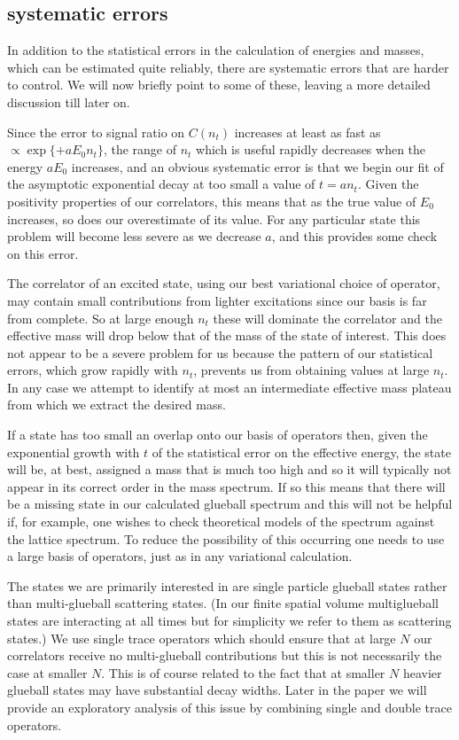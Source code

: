 \documentclass[12pt]{article}
\begin{document}
%
%
\subsection{systematic errors}
\label{subsection_lattice_systematics}

In addition to the statistical errors in the calculation of energies and masses, which
can be estimated quite reliably, there are systematic errors that are harder to control.
We will now briefly point to some of these, leaving a more detailed discussion till later on.

Since the error to signal ratio on $C(n_t)$ increases at least as fast as
$\propto \exp\{+aE_0n_t\}$, the range of $n_t$ which is useful rapidly decreases
when the energy $aE_0$ increases, and an obvious systematic error is that we begin our
fit of the asymptotic exponential decay at too small a value of $t=an_t$.
Given the positivity properties of our correlators, this means that as the true
value of $E_0$ increases, so does our overestimate of its value. For any particular
state this problem will become less severe as we decrease $a$, and this provides
some check on this error.

The correlator of an excited state, using our best variational choice of operator,
may contain small contributions from lighter excitations since our basis is far
from complete. So at large enough $n_t$ these will dominate the correlator and
the effective mass will drop below that of the mass of the state of interest.
This does not appear to be a severe problem for us because the pattern of our statistical
errors, which grow rapidly with $n_t$, prevents us from obtaining values at large $n_t$.
In any case we attempt to identify at most an intermediate effective mass plateau
from which we extract the desired mass.

If a state has too small an overlap onto our basis of operators then, given the
exponential growth with $t$ of the statistical error on the effective energy, the
state will be, at best, assigned a mass that is much too high and so it will typically not
appear in its correct order in the mass spectrum. If so this means that there will be
a missing state in our calculated glueball spectrum and this will not be helpful if,
for example, one wishes to check theoretical models of the spectrum against the lattice
spectrum. To reduce the possibility of this occurring one needs to use a large basis of
operators, just as in any variational calculation.

The states we are primarily interested in are single particle glueball states rather
than multi-glueball scattering states. (In our finite spatial volume multiglueball states
are interacting at all times but for simplicity we refer to them as scattering states.)
We use single trace operators which should ensure that at large $N$ our correlators
receive no multi-glueball contributions but this is not necessarily the case
at smaller $N$. This is of course related to the fact that at smaller $N$ 
heavier glueball states may have substantial decay widths. Later in the paper we will
provide an exploratory analysis of this issue by combining single and double trace
operators.
\end{document}
